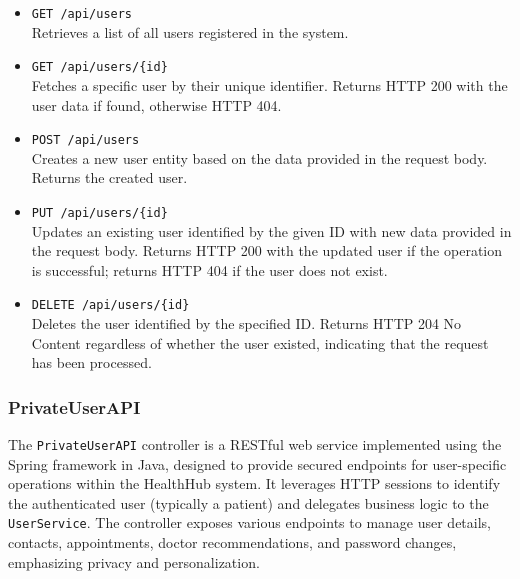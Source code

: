 \begin{itemize}
	\item \texttt{GET /api/users} \\
	Retrieves a list of all users registered in the system.
	
	\item \texttt{GET /api/users/\{id\}} \\
	Fetches a specific user by their unique identifier. Returns HTTP 200 with the user data if found, otherwise HTTP 404.
	
	\item \texttt{POST /api/users} \\
	Creates a new user entity based on the data provided in the request body. Returns the created user.
	
	\item \texttt{PUT /api/users/\{id\}} \\
	Updates an existing user identified by the given ID with new data provided in the request body. Returns HTTP 200 with the updated user if the operation is successful; returns HTTP 404 if the user does not exist.
	
	\item \texttt{DELETE /api/users/\{id\}} \\
	Deletes the user identified by the specified ID. Returns HTTP 204 No Content regardless of whether the user existed, indicating that the request has been processed.
\end{itemize}

\subsubsection{PrivateUserAPI}
The \texttt{PrivateUserAPI} controller is a RESTful web service implemented using the Spring framework in Java, designed to provide secured endpoints for user-specific operations within the HealthHub system. It leverages HTTP sessions to identify the authenticated user (typically a patient) and delegates business logic to the \texttt{UserService}. The controller exposes various endpoints to manage user details, contacts, appointments, doctor recommendations, and password changes, emphasizing privacy and personalization.

